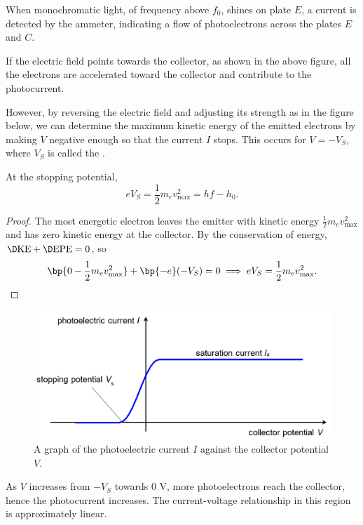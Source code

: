 When monochromatic light, of frequency above $f_0$, shines on plate $E$, a current is detected by the ammeter, indicating a flow of photoelectrons across the plates $E$ and $C$.

If the electric field points towards the collector, as shown in the above figure, all the electrons are accelerated toward the collector and contribute to the photocurrent.

However, by reversing the electric field and adjusting its strength as in the figure below, we can determine the maximum kinetic energy of the emitted electrons by making $V$ negative enough so that the current $I$ stops. This occurs for $V = -V_S$, where $V_S$ is called the .

\begin{proposition}
    At the stopping potential, \[eV_S = \frac12 m_e v_{\text{max}}^2 = hf - h_0.\]
\end{proposition}
\begin{proof}
    The most energetic electron leaves the emitter with kinetic energy $\frac12 m_e v_{\text{max}}^2$ and has zero kinetic energy at the collector. By the conservation of energy, $\D \text{KE} + \D \text{EPE} = 0$, so \[\bp{0 - \frac12 m_e v_{\text{max}}^2} + \bp{-e}(-V_S) = 0 \implies eV_S = \frac12 m_e v_{\text{max}}^2.\]
\end{proof}

\begin{figure}[H]
    \centering
    \includegraphics[scale=0.6]{media/Photoelectric Effect - IV Graph.png}
    \caption{A graph of the photoelectric current $I$ against the collector potential $V$.\protect\footnotemark}
\end{figure}

As $V$ increases from $-V_S$ towards 0 V, more photoelectrons reach the collector, hence the photocurrent increases. The current-voltage relationship in this region is approximately linear.

